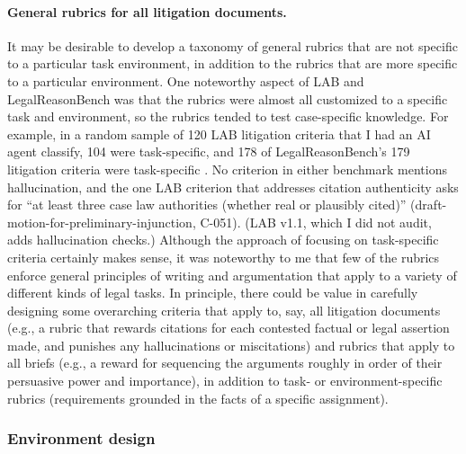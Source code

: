 \documentclass[11pt]{article}
\newcommand{\lrbCriteria}{179}
\begin{document}
\paragraph{General rubrics for all litigation documents.} It may be desirable to develop a taxonomy of general rubrics that are not specific to a particular task environment, in addition to the rubrics that are more specific to a particular environment. One noteworthy aspect of LAB and LegalReasonBench was that the rubrics were almost all customized to a specific task and environment, so the rubrics tended to test case-specific knowledge. For example, in a random sample of 120 LAB litigation criteria that I had an AI agent classify, 104 were task-specific, and 178 of LegalReasonBench's \lrbCriteria{} litigation criteria were task-specific \citep{rubricGenerality}. No criterion in either benchmark mentions hallucination, and the one LAB criterion that addresses citation authenticity asks for ``at least three case law authorities (whether real or plausibly cited)'' (draft-motion-for-preliminary-injunction, C-051). (LAB v1.1, which I did not audit, adds hallucination checks.) Although the approach of focusing on task-specific criteria certainly makes sense, it was noteworthy to me that few of the rubrics enforce general principles of writing and argumentation that apply to a variety of different kinds of legal tasks. In principle, there could be value in carefully designing some overarching criteria that apply to, say, all litigation documents (e.g., a rubric that rewards citations for each contested factual or legal assertion made, and punishes any hallucinations or miscitations) and rubrics that apply to all briefs (e.g., a reward for sequencing the arguments roughly in order of their persuasive power and importance), in addition to task- or environment-specific rubrics (requirements grounded in the facts of a specific assignment).

\subsubsection{Environment design}
\end{document}
